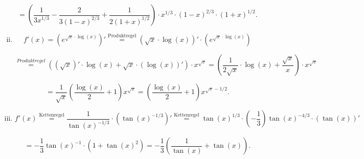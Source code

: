 \documentclass[a4paper, 20]{exam}
\begin{document}
\begin{solution}
\begin{enumerate}[i.)]
$$=\left( \frac{1}{3x^{1/3}} - \frac{2}{3(1-x)^{2/3}} + \frac{1}{2(1+x)^{1/2}} \right)\cdot x^{1/3} \cdot (1-x)^{2/3} \cdot (1+x)^{1/2}.$$
\item
$$f'(x)= \left( e^{\sqrt{x} \cdot\log(x)} \right)'
\stackrel{\text{Produktregel}}{=} \left( \sqrt{x} \cdot\log(x) \right)' \cdot \left( e^{\sqrt{x} \cdot\log(x)} \right)$$

$$\stackrel{Produktregel}{=} \left( (\sqrt{x})' \cdot\log(x) + \sqrt{x} \cdot (\log(x))' \right) \cdot x^{\sqrt{x}}
= \left( \frac{1}{2\sqrt{x}} \cdot\log(x) + \frac{\sqrt{x}}{x} \right) \cdot x^{\sqrt{x}}$$

$$= \frac{1}{\sqrt{x}}\left(\frac{\log(x)}{2} +1\right) x^{\sqrt{x}} 
= \left(\frac{\log(x)}{2} +1\right) x^{\sqrt{x}-1/2} .$$
\item
$$ f'(x) \stackrel{\text{Kettenregel}}{=} \frac{1}{\tan(x)^{-1/3}} \cdot \left( \tan(x)^{-1/3} \right)'
\stackrel{\text{Kettenregel}}{=} \tan(x)^{1/3} \cdot \left( -\frac{1}{3} \right) \tan(x)^{-4/3} \cdot \left( \tan(x) \right)'$$

$$ = -\frac{1}{3} \tan(x)^{-1} \cdot \left(1+ \tan(x)^2 \right)
= -\frac{1}{3} \left( \frac{1}{\tan(x)} + \tan(x) \right).$$
\end{enumerate}
\end{solution}
\end{document}
